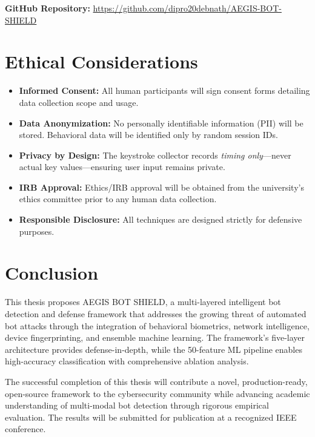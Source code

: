 \documentclass[12pt, a4paper]{article}
\begin{document}
\textbf{GitHub Repository:} \url{https://github.com/dipro20debnath/AEGIS-BOT-SHIELD}

\section{Ethical Considerations}

\begin{itemize}[leftmargin=*]
    \item \textbf{Informed Consent:} All human participants will sign consent forms detailing data collection scope and usage.
    \item \textbf{Data Anonymization:} No personally identifiable information (PII) will be stored. Behavioral data will be identified only by random session IDs.
    \item \textbf{Privacy by Design:} The keystroke collector records \textit{timing only}---never actual key values---ensuring user input remains private.
    \item \textbf{IRB Approval:} Ethics/IRB approval will be obtained from the university's ethics committee prior to any human data collection.
    \item \textbf{Responsible Disclosure:} All techniques are designed strictly for defensive purposes.
\end{itemize}

\section{Conclusion}

This thesis proposes AEGIS BOT SHIELD, a multi-layered intelligent bot detection and defense framework that addresses the growing threat of automated bot attacks through the integration of behavioral biometrics, network intelligence, device fingerprinting, and ensemble machine learning. The framework's five-layer architecture provides defense-in-depth, while the 50-feature ML pipeline enables high-accuracy classification with comprehensive ablation analysis.

The successful completion of this thesis will contribute a novel, production-ready, open-source framework to the cybersecurity community while advancing academic understanding of multi-modal bot detection through rigorous empirical evaluation. The results will be submitted for publication at a recognized IEEE conference.
\end{document}
